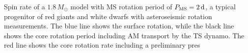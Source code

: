  \label{fig:MRI1.8rot} Spin rate of a $1.8 \, M_\odot$ model with MS rotation period of $P_{\rm MS} = 2 \, {\rm d}$, a typical progenitor of red giants and white dwarfs with asteroseismic rotation measurements. The blue line shows the surface rotation, while the black line shows the core rotation period including AM transport by the TS dynamo. The red line shows the core rotation rate including a preliminary pres